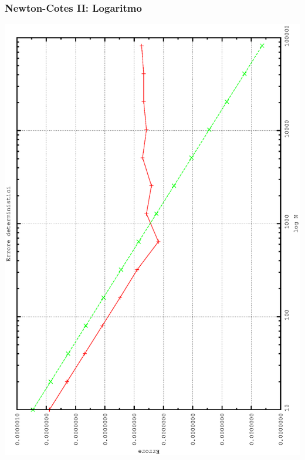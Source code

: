 \subsubsection{Newton-Cotes II: Logaritmo}
\begin{center}
\includegraphics[width=0.7\columnwidth,angle=-90]{plot_simp_log.eps}
\end{center}

